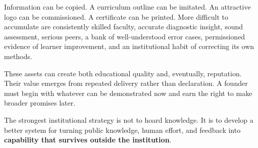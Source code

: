 Information can be copied. A curriculum outline can be imitated. An attractive logo can be commissioned. A certificate can be printed. More difficult to accumulate are consistently skilled faculty, accurate diagnostic insight, sound assessment, serious peers, a bank of well-understood error cases, permissioned evidence of learner improvement, and an institutional habit of correcting its own methods.

These assets can create both educational quality and, eventually, reputation. Their value emerges from repeated delivery rather than declaration. A founder must begin with whatever can be demonstrated now and earn the right to make broader promises later.

The strongest institutional strategy is not to hoard knowledge. It is to develop a better system for turning public knowledge, human effort, and feedback into \textbf{capability that survives outside the institution}.
